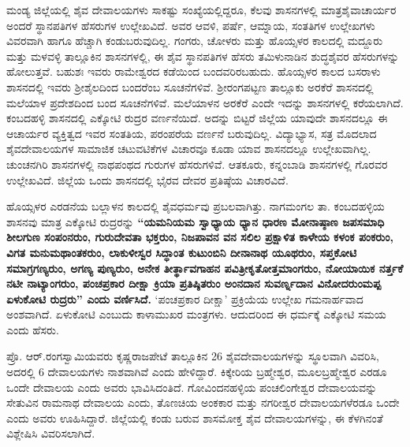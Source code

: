 ಮಂಡ್ಯ ಜಿಲ್ಲೆಯಲ್ಲಿ ಶೈವ ದೇವಾಲಯಗಳು ಸಾಕಷ್ಟು ಸಂಖ್ಯೆಯಲ್ಲಿದ್ದರೂ, ಕೆಲವು ಶಾಸನಗಳಲ್ಲಿ ಮಾತ್ರ\break ಶೈವಾಚಾರ್ಯರ ಅಂದರೆ ಸ್ಥಾನಪತಿಗಳ ಹೆಸರುಗಳ ಉಲ್ಲೇಖವಿದೆ. ಅವರ ಆವಳಿ, ಪರ್ಷೆ, ಆಮ್ನಾಯ, ಸಂತತಿಗಳ ಉಲ್ಲೇಖಗಳು ವಿವರವಾಗಿ ಹಾಗೂ ಹೆಚ್ಚಾಗಿ ಕಂಡುಬರುವುದಿಲ್ಲ. ಗಂಗರು, ಚೋಳರು ಮತ್ತು ಹೊಯ್ಸಳರ ಕಾಲದಲ್ಲಿ ಮದ್ದೂರು ಮತ್ತು ಮಳವಳ್ಳಿ ತಾಲ್ಲೂಕಿನ ಶಾಸನಗಳಲ್ಲಿ, ಈ ಶೈವ ಸ್ಥಾನಪತಿಗಳ ಹೆಸರು ತಮಿಳುನಾಡಿನ ಶುದ್ಧಶೈವರ ಹೆಸರುಗಳನ್ನು ಹೋಲುತ್ತವೆ. ಬಹುಶಃ ಇವರು ರಾಮೇಶ್ವರದ ಕಡೆಯಿಂದ ಬಂದವರಿರಬಹುದು. ಹೊಯ್ಸಳರ ಕಾಲದ ಬಸರಾಳು ಶಾಸನದಲ್ಲಿ ಇವರು ಶ‍್ರೀಶೈಲದಿಂದ ಬಂದರೆಂಬ ಸೂಚನೆಗಳಿವೆ. ಶ‍್ರೀರಂಗಪಟ್ಟಣ ತಾಲ್ಲೂಕು ಅರಕೆರೆ ಶಾಸನದಲ್ಲಿ ಮಲೆಯಾಳ ಪ್ರದೇಶದಿಂದ ಬಂದ ಸೂಚನೆಗಳಿವೆ. ಮಲೆಯಾಳನ ಅರಕೆರೆ ಎಂದೇ ಇದನ್ನು ಶಾಸನಗಳಲ್ಲಿ ಕರೆಯಲಾಗಿದೆ. ಕಂಬದಹಳ್ಳಿ ಶಾಸನದಲ್ಲಿ ಎಕ್ಕೋಟಿ ರುದ್ರರ ವರ್ಣನೆಯಿದೆ. ಅದನ್ನು ಬಿಟ್ಟರೆ ಜಿಲ್ಲೆಯ ಯಾವುದೇ ಶಾಸನದಲ್ಲೂ ಈ ಆಚಾರ್ಯರ ವ್ಯಕ್ತಿತ್ವದ ಇವರ ಸಂತತಿಯ, ಪರಂಪರೆಯ ವರ್ಣನೆ ಬರುವುದಿಲ್ಲ. ವಿದ್ಯಾಭ್ಯಾಸ, ಸತ್ರ ಮೊದಲಾದ ಶೈವದೇವಾಲಯಗಳ ಸಾಮಾಜಿಕ ಚಟುವಟಿಕೆಗಳ ವಿಚಾರವೂ ಕೂಡಾ ಯಾವ ಶಾಸನದಲ್ಲೂ ಉಲ್ಲೇಖವಾಗಿಲ್ಲ. ಚುಂಚನಗಿರಿ ಶಾಸನಗಳಲ್ಲಿ ನಾಥಪಂಥದ ಗುರುಗಳ ಹೆಸರುಗಳಿವೆ. ಆತಕೂರು, ಕನ್ನಂಬಾಡಿ ಶಾಸನಗಳಲ್ಲಿ ಗೊರವರ ಉಲ್ಲೇಖವಿದೆ. ಜಿಲ್ಲೆಯ ಒಂದು ಶಾಸನದಲ್ಲಿ ಭೈರವ ದೇವರ ಪ್ರತಿಷ್ಠೆಯ ವಿಚಾರವಿದೆ.

ಹೊಯ್ಸಳರ ಎರಡನೆಯ ಬಲ್ಲಾಳನ ಕಾಲದಲ್ಲಿ ಶೈವಧರ್ಮವು ಪ್ರಬಲವಾಗಿತ್ತು. ನಾಗಮಂಗಲ ತಾ. ಕಂಬದಹಳ್ಳಿಯ ಶಾಸನವು ಮಾತ್ರ ಎಕ್ಕೋಟಿ ರುದ್ರರನ್ನು \textbf{“ಯಮನಿಯಮ ಸ್ವಾಧ್ಯಾಯ ಧ್ಯಾನ ಧಾರಣ ಮೋನಾಷ್ಠಾಣ ಜಪಸಮಾಧಿ ಶೀಲಗುಣ ಸಂಪಂನರುಂ, ಗುರುದೇವತಾ ಭಕ್ತರುಂ, ನಿಜಪಾವನ ವನ ಸಲಿಲ ಪ್ರಕ್ಷಾಳಿತ ಕಾಳೇಯ ಕಳಂಕ ಪಂಕರುಂ, ವಿಗತ ಮನುಮಥಾಂತಕರುಂ, ಲಾಕುಳೀಸ್ವರ ಸಿದ್ಧಾಂತ ಕುಟುಂಬಿನಿ ದೀನಾನಾಥ ಯೂಥರುಂ, ಸಪ್ತಕೋಟಿ ಸಮಾಗ್ರಗಣ್ಯರುಂ, ಅಗಣ್ಯ ಪುಣ್ಯರುಂ, ಅನೇಕ ತೀರ್ತ್ಥಾವಗಾಹನ ಪವಿತ್ರೀಕೃತೋತ್ತಮಾಂಗರುಂ, ನೋಯಾಯಿಕ ನರ್ತ್ತಕೆ ನಟೀ ನಾಟ್ಯಾಂಗರುಂ, ಪಂಚಪ್ರಕಾರ ದೀಕ್ಷಾ ಕ್ರಿಯಾ ಪ್ರತಿಷ್ಠಿತರುಂ ಅಂನದಾನ ಸುವರ್ಣ್ನದಾನ ವಿನೋದರುಂಮಪ್ಪ ಏಳುಕೋಟಿ ರುದ್ರರು” ಎಂದು ವರ್ಣಿಸಿದೆ.} ‘ಪಂಚಪ್ರಕಾರ ದೀಕ್ಷಾ’ ಪ್ರಕ್ರಿಯೆಯ ಉಲ್ಲೇಖ ಗಮನಾರ್ಹವಾದ ಅಂಶವಾಗಿದೆ. ಏಳುಕೋಟಿ ಎಂಬುದು ಕಾಳಾಮುಖರ ಮಂತ್ರಗಳು. ಆದುದರಿಂದ ಈ ಧರ್ಮಕ್ಕೆ ಎಕ್ಕೋಟಿ ಸಮಯ ಎಂದು ಹೆಸರು.

ಪ್ರೊ. ಆರ್​.ರಂಗಸ್ವಾಮಿಯವರು ಕೃಷ್ಣರಾಜಪೇಟೆ ತಾಲ್ಲೂಕಿನ 26 ಶೈವದೇವಾಲಯಗಳನ್ನು ಸ್ಥೂಲವಾಗಿ ವಿವರಿಸಿ, ಅದರಲ್ಲಿ 6 ದೇವಾಲಯಗಳು ನಾಶವಾಗಿವೆ ಎಂದು ಹೇಳಿದ್ದಾರೆ. ಕಿಕ್ಕೇರಿಯ ಬ್ರಹ್ಮೇಶ್ವರ, ಮೂಲಬ್ರಹ್ಮೇಶ್ವರ ಎರಡೂ ಒಂದೇ ದೇವಾಲಯ ಎಂದು ಅವರು ಭಾವಿಸಿದಂತಿದೆ. ಗೋವಿಂದನಹಳ್ಳಿಯ ಪಂಚಲಿಂಗೇಶ್ವರ ದೇವಾಲಯವನ್ನು ಸೇತುವಿನ ರಾಮನಾಥ ದೇವಾಲಯ ಎಂದು, ತೊಣಚಿಯ ಅಂಕಕಾರ ಮತ್ತು ನಗರೀಶ್ವರ ದೇವಾಲಯಗಳೆರಡೂ ಒಂದೇ ಎಂದು ಅವರು ಊಹಿಸಿದ್ದಾರೆ. ಜಿಲ್ಲೆಯಲ್ಲಿ ಕಂಡು ಬರುವ ಶಾಸಮೋಕ್ತ ಶೈವ ದೇವಾಲಯಗಳನ್ನು, ಈ ಕೆಳಗಿನಂತೆ ವಿಶ್ಲೇಷಿಸಿ ವಿವರಿಸಲಾಗಿದೆ.

